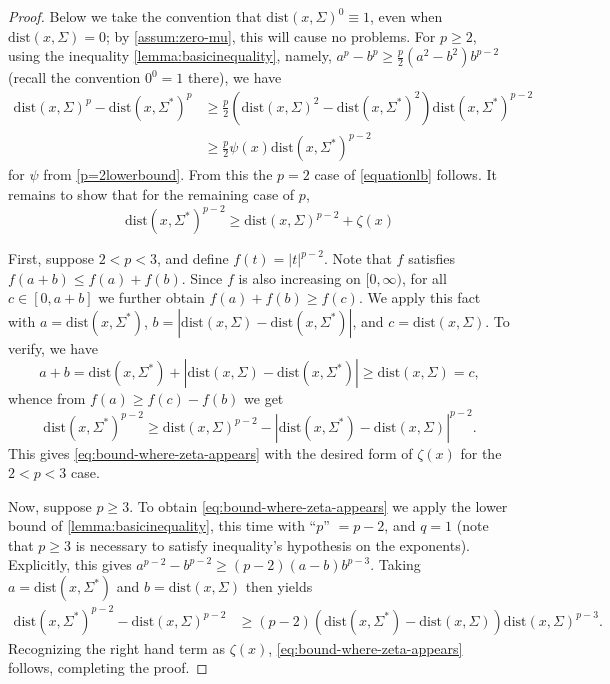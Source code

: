 \documentclass[preprint, reqno]{amsart}
\newcommand{\dist}{\mathrm{dist}}
\theoremstyle{definition}
\numberwithin{equation}{section}
\begin{document}
\begin{proof}
  Below we take the convention that $\dist(x,\Sigma)^0 \equiv 1$, even
  when $\dist(x,\Sigma)=0$; by \eqref{assum:zero-mu}, this will cause
  no problems. For $p \ge 2$, using the inequality
  \eqref{lemma:basicinequality}, namely, $a^p - b^p \geq
  \frac{p}{2}(a^2 - b^2)b^{p-2}$ (recall the convention $0^0=1$
  there), we have
  \begin{align*}
    \dist(x, \Sigma)^p - \dist(x, \Sigma^*)^p
    & \geq \frac{p}{2}(\dist(x, \Sigma)^2 - \dist(x,
      \Sigma^*)^2)\dist(x,\Sigma^*)^{p-2}\\
    & \ge \frac{p}{2}  \psi (x)  \dist(x,\Sigma^*)^{p-2}
  \end{align*}
  for $\psi$ from \cref{p=2lowerbound}.
  From this the $p=2$ case of \eqref{equationlb} follows.
  It remains to show that for the remaining case of $p$,
  \begin{equation}
    \dist(x, \Sigma^*)^{p-2} \geq \dist(x, \Sigma)^{p-2} +
    \zeta(x)
    \label{eq:bound-where-zeta-appears}
  \end{equation}

  First, suppose $2 < p < 3$, and define $f(t) = |t|^{p-2}$.
  Note that $f$ satisfies $f(a+b) \le f(a)+f(b)$. Since $f$ is also
  increasing on $[0,\infty)$, for all $c \in [0,a+b]$ we further
  obtain $f(a) + f(b) \geq f(c)$. We apply this fact with $a =
  \dist(x, \Sigma^*)$, $b = |\dist(x, \Sigma)- \dist(x, \Sigma^*)|$,
  and $c = \dist(x,\Sigma)$. To verify, we have
  \[
    a + b = \dist(x, \Sigma^*) + |\dist(x, \Sigma)- \dist(x,
    \Sigma^*)| \geq \dist(x, \Sigma) = c,
  \]
  whence from $f(a) \geq f(c) - f(b)$ we get
  \[
    \dist(x, \Sigma^*)^{p-2} \geq \dist(x, \Sigma)^{p-2} - |\dist(x,
    \Sigma^*) - \dist(x, \Sigma)|^{p-2}.
  \]
  This gives \eqref{eq:bound-where-zeta-appears} with the desired form
  of $\zeta(x)$ for the $2 < p < 3$ case.

  Now, suppose $p \geq 3$. To obtain
  \eqref{eq:bound-where-zeta-appears} we apply the lower bound of
  \eqref{lemma:basicinequality}, this time with ``$p$'' $= p-2$, and
  $q=1$ (note that $p \geq 3$ is necessary to satisfy inequality's
  hypothesis on the exponents). Explicitly, this gives $a^{p-2} -
  b^{p-2} \geq (p-2) (a - b) b^{p-3}$. Taking $a=\dist(x, \Sigma^*)$
  and $b = \dist(x, \Sigma)$ then yields
  \begin{align*}
    \dist(x,\Sigma^*)^{p-2} - \dist(x,\Sigma)^{p-2}
    &\geq (p-2) (\dist(x,\Sigma^*) - \dist(x,\Sigma))
      \dist(x,\Sigma)^{p-3}.
  \end{align*}
  Recognizing the right hand term as $\zeta(x)$,
  \eqref{eq:bound-where-zeta-appears} follows, completing the
  proof.
\end{proof}
\end{document}
